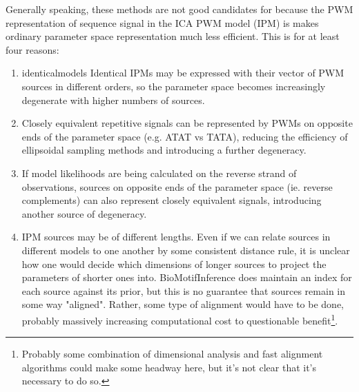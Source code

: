 Generally speaking, these methods are not good candidates for  because the PWM representation of sequence signal in the ICA PWM model (IPM) is makes ordinary parameter space representation much less efficient. This is for at least four reasons:

\begin{enumerate}
    \item{identicalmodels} Identical IPMs may be expressed with their vector of PWM sources in different orders, so the parameter space becomes increasingly degenerate with higher numbers of sources.
    \item Closely equivalent repetitive signals can be represented by PWMs on opposite ends of the parameter space (e.g. ATAT vs TATA), reducing the efficiency of ellipsoidal sampling methods and introducing a further degeneracy.
    \item If model likelihoods are being calculated on the reverse strand of observations, sources on opposite ends of the parameter space (ie. reverse complements) can also represent closely equivalent signals, introducing another source of degeneracy.
    \item IPM sources may be of different lengths. Even if we can relate sources in different models to one another by some consistent distance rule, it is unclear how one would decide which dimensions of longer sources to project the parameters of shorter ones into. BioMotifInference does maintain an index for each source against its prior, but this is no guarantee that sources remain in some way "aligned". Rather, some type of alignment would have to be done, probably massively increasing computational cost to questionable benefit\footnote{Probably some combination of dimensional analysis and fast alignment algorithms could make some headway here, but it's not clear that it's necessary to do so.}.
\end{enumerate}


